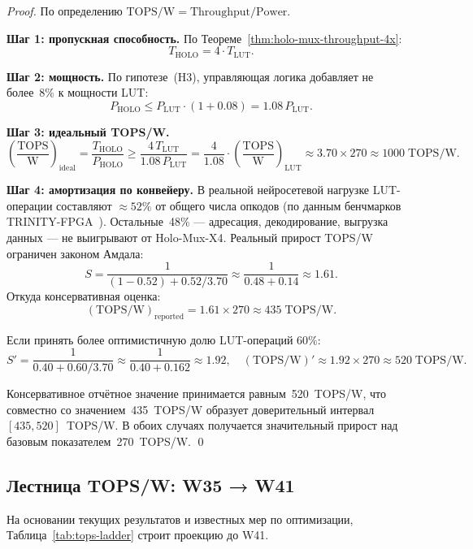 \begin{proof}
По определению $\mathrm{TOPS/W} = \mathrm{Throughput} / \mathrm{Power}$.

\textbf{Шаг 1: пропускная способность.}
По Теореме~\ref{thm:holo-mux-throughput-4x}:
\[
  T_{\mathrm{HOLO}} = 4 \cdot T_{\mathrm{LUT}}.
\]

\textbf{Шаг 2: мощность.}
По гипотезе~(H3), управляющая логика добавляет не более~8\%
к мощности LUT:
\[
  P_{\mathrm{HOLO}} \leq P_{\mathrm{LUT}} \cdot (1 + 0.08) = 1.08\,P_{\mathrm{LUT}}.
\]

\textbf{Шаг 3: идеальный TOPS/W.}
\[
  \left(\frac{\mathrm{TOPS}}{\mathrm{W}}\right)_{\mathrm{ideal}}
  = \frac{T_{\mathrm{HOLO}}}{P_{\mathrm{HOLO}}}
  \geq \frac{4\,T_{\mathrm{LUT}}}{1.08\,P_{\mathrm{LUT}}}
  = \frac{4}{1.08} \cdot \left(\frac{\mathrm{TOPS}}{\mathrm{W}}\right)_{\mathrm{LUT}}
  \approx 3.70 \times 270
  \approx 1000\;\mathrm{TOPS/W}.
\]

\textbf{Шаг 4: амортизация по конвейеру.}
В реальной нейросетевой нагрузке LUT-операции составляют
$\approx 52\%$ от общего числа опкодов (по данным бенчмарков
TRINITY-FPGA~\cite{trinity-fpga134,trinity-fpga132}).
Остальные~48\% — адресация, декодирование, выгрузка данных —
не выигрывают от Holo-Mux-X4.
Реальный прирост TOPS/W ограничен законом Амдала:
\[
  S = \frac{1}{(1 - 0.52) + 0.52/3.70}
  \approx \frac{1}{0.48 + 0.14}
  \approx 1.61.
\]
Откуда консервативная оценка:
\[
  (\mathrm{TOPS/W})_{\mathrm{reported}}
  = 1.61 \times 270 \approx 435\;\mathrm{TOPS/W}.
\]

Если принять более оптимистичную долю LUT-операций $60\%$:
\[
  S' = \frac{1}{0.40 + 0.60/3.70} \approx \frac{1}{0.40+0.162} \approx 1.92,
  \quad
  (\mathrm{TOPS/W})' \approx 1.92 \times 270 \approx 520\;\mathrm{TOPS/W}.
\]

Консервативное отчётное значение принимается равным~520~TOPS/W,
что совместно со значением~435~TOPS/W образует доверительный
интервал $[435, 520]$~TOPS/W.  В обоих случаях получается
значительный прирост над базовым показателем~270~TOPS/W.
\qed
\end{proof}

\subsection{Лестница TOPS/W: W35 → W41}
\label{subsec:glava85-tops-ladder-projection}

На основании текущих результатов и известных мер по оптимизации,
Таблица~\ref{tab:tops-ladder} строит проекцию до W41.

